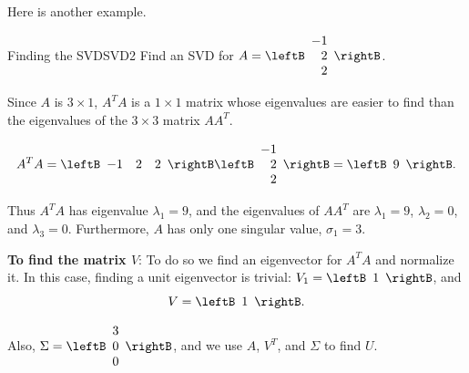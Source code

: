 Here is another example. 

\begin{example}{Finding the SVD}{SVD2}
Find an SVD for
$A=\leftB\begin{array}{r} -1 \\ 2\\ 2 \end{array}\rightB$.
\end{example}

\begin{solution}
Since $A$ is $3\times 1$, $A^T A$ is a $1\times 1$ matrix
whose eigenvalues are easier to find than the eigenvalues of
the $3\times 3$ matrix $AA^T$.

\[ A^TA=\leftB\begin{array}{ccc} -1 & 2 & 2 \end{array}\rightB
\leftB\begin{array}{r} -1 \\ 2 \\ 2 \end{array}\rightB
=\leftB\begin{array}{r} 9 \end{array}\rightB.\]

Thus $A^TA$ has eigenvalue $\lambda_1=9$, and
the eigenvalues of $AA^T$ are $\lambda_1=9$, $\lambda_2=0$, and
$\lambda_3=0$. 
Furthermore, $A$ has only one singular value, $\sigma_1=3$.

{\bf To find the matrix $V$}:
To do so we find an eigenvector for $A^TA$ and
normalize it.
In this case, finding a unit eigenvector is trivial:
$V_1=\leftB\begin{array}{r} 1 \end{array}\rightB$, and
\[ V=\leftB\begin{array}{r} 1 \end{array}\rightB.\]

Also,
$\Sigma =\leftB\begin{array}{r} 3 \\ 0\\ 0 \end{array}\rightB$,
and we use $A$, $V^T$, and $\Sigma$ to find $U$.



\end{solution}

